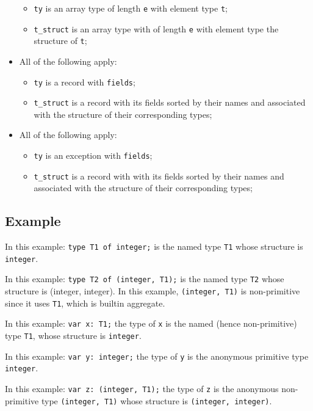 \documentclass{book}
\begin{document}
\begin{itemize}
      \begin{itemize}
        \item \texttt{ty} is an array type of length \texttt{e} with element type
          \texttt{t};
        \item \texttt{t\_struct} is an array type with of length \texttt{e}
          with element type the structure of \texttt{t};
      \end{itemize}
    \item All of the following apply:
      \begin{itemize}
      \item \texttt{ty} is a record with \texttt{fields};
      \item \texttt{t\_struct} is a record with its fields sorted by their names and associated with the structure of their corresponding types;
      \end{itemize}
    \item All of the following apply:
      \begin{itemize}
      \item \texttt{ty} is an exception with \texttt{fields};
      \item \texttt{t\_struct} is a record with with its fields sorted by their names and associated with the structure of their corresponding types;
      \end{itemize}
    \end{itemize}

    \subsection{Example}
    In this example:
    \texttt{type T1 of integer;} is the named type \texttt{T1}
whose structure is \texttt{integer}.

    In this example:
    \texttt{type T2 of (integer, T1);}
    is the named type \texttt{T2} whose structure is (integer, integer). In this
    example, \texttt{(integer, T1)} is non-primitive since it uses \texttt{T1}, which is builtin aggregate.

    In this example:
    \texttt{var x: T1;}
    the type of \texttt{x} is the named (hence non-primitive) type \texttt{T1}, whose structure
    is \texttt{integer}.

    In this example:
    \texttt{var y: integer;}
    the type of \texttt{y} is the anonymous primitive type \texttt{integer}.

    In this example:
    \texttt{var z: (integer, T1);}
    the type of \texttt{z} is the anonymous non-primitive type
\texttt{(integer, T1)} whose structure is \texttt{(integer, integer)}.
\end{document}
